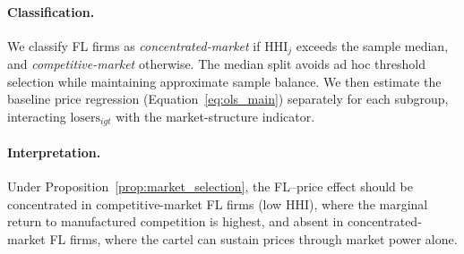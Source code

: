 \paragraph{Classification.}
We classify FL firms as \emph{concentrated-market} if
$\text{HHI}_j$ exceeds the sample median, and
\emph{competitive-market} otherwise. The median split avoids ad hoc
threshold selection while maintaining approximate sample balance.
We then estimate the baseline price regression
(Equation~\ref{eq:ols_main}) separately for each subgroup,
interacting $\text{losers}_{igt}$ with the market-structure
indicator.

\paragraph{Interpretation.}
Under Proposition~\ref{prop:market_selection}, the FL--price effect
should be concentrated in competitive-market FL firms (low HHI), where
the marginal return to manufactured competition is highest, and absent
in concentrated-market FL firms, where the cartel can sustain prices
through market power alone.

